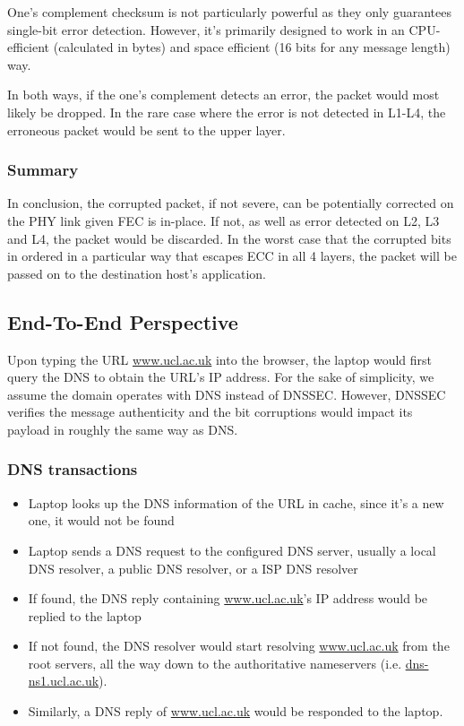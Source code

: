 \documentclass[12pt,letterpaper]{article}
\begin{document}
One's complement checksum is not particularly powerful as they only guarantees single-bit error detection. However, it's primarily designed to work in an CPU-efficient (calculated in bytes) and space efficient (16 bits for any message length) way.

In both ways, if the one's complement detects an error, the packet would most likely be dropped. In the rare case where the error is not detected in L1-L4, the erroneous packet would be sent to the upper layer.

\subsubsection{Summary}

In conclusion, the corrupted packet, if not severe, can be potentially corrected on the PHY link given FEC is in-place. If not, as well as error detected on L2, L3 and L4, the packet would be discarded. In the worst case that the corrupted bits in ordered in a particular way that escapes ECC in all 4 layers, the packet will be passed on to the destination host's application.

\subsection{End-To-End Perspective}

Upon typing the URL \url{www.ucl.ac.uk} into the browser, the laptop would first query the DNS to obtain the URL's IP address. For the sake of simplicity, we assume the domain operates with DNS instead of DNSSEC. However, DNSSEC verifies the message authenticity and the bit corruptions would impact its payload in roughly the same way as DNS.

\subsubsection{DNS transactions}

\begin{itemize}
    \item Laptop looks up the DNS information of the URL in cache, since it's a new one, it would not be found
    \item Laptop sends a DNS request to the configured DNS server, usually a local DNS resolver, a public DNS resolver, or a ISP DNS resolver
    \item If found, the DNS reply containing \url{www.ucl.ac.uk}'s IP address would be replied to the laptop
    \item If not found, the DNS resolver would start resolving \url{www.ucl.ac.uk} from the root servers, all the way down to the authoritative nameservers (i.e. \url{dns-ns1.ucl.ac.uk}).
    \item Similarly, a DNS reply of \url{www.ucl.ac.uk} would be responded to the laptop.
\end{itemize}
\end{document}

